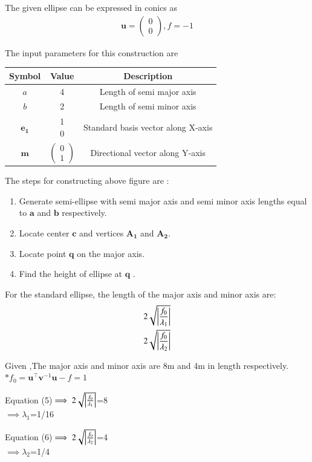 \documentclass[10pt, a4paper]{article}
\newcommand{\myvec}[1]{\ensuremath{\begin{pmatrix}#1\end{pmatrix}}}
\let\vec\mathbf
\begin{document}
The given ellipse can be expressed in  conics as\\ 
\begin{align}
\vec{u} = \myvec{0 \\0} , f =-1 
\end{align}


    The input parameters for this construction are
\begin{center}
\begin{tabular}{|c|c|c|}
	\hline
	\textbf{Symbol}&\textbf{Value}&\textbf{Description}\\
	\hline
	$a$ &4&Length of semi major axis\\
	\hline
    $b$ &2&Length of semi minor axis\\
    \hline
    $\vec{e_1}$ &\myvec{1\\0}&Standard basis vector along X-axis \\
	\hline
    $\vec{m}$ & $\myvec{0\\1}$ &Directional vector along Y-axis\\
	\hline
\end{tabular}


    The steps for constructing above figure are :
\begin{enumerate}
 \item Generate semi-ellipse with semi major axis and semi minor axis lengths equal to $\vec{a}$ and $\vec{b}$ respectively.
 \item Locate center $\vec{c}$ and vertices $\vec{A_1}$ and $\vec{A_2}$.
 \item Locate point $\vec{q}$ on the major axis.
 \item Find the height of ellipse at $\vec{q}$ .
\end{enumerate}

For the standard ellipse, the length of the major axis and minor axis are:
\begin{align}
2\sqrt{\left\vert\frac{f_0}{\lambda_1}\right\vert} \\
2\sqrt{\left\vert\frac{f_0}{\lambda_2}\right\vert} 
\end{align}

Given ,The major axis and minor axis are 8m and 4m in length respectively. \\
$*f_0=\vec{u}^{\top} \vec{v}^{-1}\vec{u}-f=1$ 


Equation (5)$\implies2\sqrt{\left\vert\frac{f_0}{\lambda_1}\right\vert}$=8\\
$\implies\lambda_1$=1/16

Equation (6)$\implies2\sqrt{\left\vert\frac{f_0}{\lambda_2}\right\vert}$=4\\
$\implies\lambda_2$=1/4


\end{center}
\end{document}
